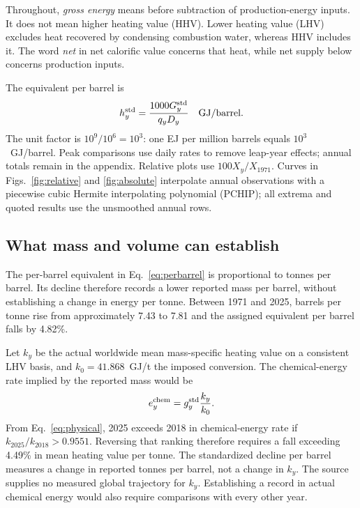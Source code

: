 \documentclass[reprint,aps,pra,longbibliography,floatfix]{revtex4-2}
\begin{document}
Throughout, \emph{gross energy} means before subtraction of production-energy inputs. It does not mean higher heating value (HHV). Lower heating value (LHV) excludes heat recovered by condensing combustion water, whereas HHV includes it. The word \emph{net} in net calorific value concerns that heat, while net supply below concerns production inputs.

The equivalent per barrel is
\begin{equation}
 h_y^{\rm std}=\frac{1000G_y^{\rm std}}{q_yD_y}
 \quad\mathrm{GJ/barrel}.
 \label{eq:perbarrel}
\end{equation}
The unit factor is $10^9/10^6=10^3$: one EJ per million barrels equals $10^3$~GJ/barrel. Peak comparisons use daily rates to remove leap-year effects; annual totals remain in the appendix. Relative plots use $100X_y/X_{1971}$. Curves in Figs.~\ref{fig:relative} and \ref{fig:absolute} interpolate annual observations with a piecewise cubic Hermite interpolating polynomial (PCHIP); all extrema and quoted results use the unsmoothed annual rows.

\subsection{What mass and volume can establish}
The per-barrel equivalent in Eq.~\eqref{eq:perbarrel} is proportional to tonnes per barrel. Its decline therefore records a lower reported mass per barrel, without establishing a change in energy per tonne. Between 1971 and 2025, barrels per tonne rise from approximately 7.43 to 7.81 and the assigned equivalent per barrel falls by 4.82\%.

Let $k_y$ be the actual worldwide mean mass-specific heating value on a consistent LHV basis, and $k_0=41.868$~GJ/t the imposed conversion. The chemical-energy rate implied by the reported mass would be
\begin{equation}
 e_y^{\rm chem}=g_y^{\rm std}\frac{k_y}{k_0}.
 \label{eq:physical}
\end{equation}
From Eq.~\eqref{eq:physical}, 2025 exceeds 2018 in chemical-energy rate if $k_{2025}/k_{2018}>0.9551$. Reversing that ranking therefore requires a fall exceeding 4.49\% in mean heating value per tonne. The standardized decline per barrel measures a change in reported tonnes per barrel, not a change in $k_y$. The source supplies no measured global trajectory for $k_y$. Establishing a record in actual chemical energy would also require comparisons with every other year.
\end{document}
